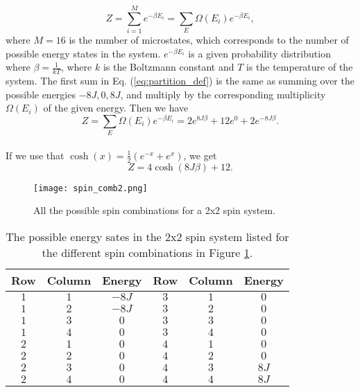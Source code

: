 \documentclass[12pt]{article}
\begin{document}
\begin{flushleft}
\vspace{5mm}
\begin{equation}\label{eq:partition_def}
Z = \sum\limits_{i=1}^{M}e^{-\beta E_i} = \sum\limits_E \Omega(E_i)e^{-\beta E_i},
\end{equation}
\vspace{5mm} 
where $M = 16$ is the number of microstates, which corresponds to the number of possible energy states in the system. $e^{-\beta E_i}$ is a given probability distribution where $\beta = \frac{1}{kT}$, where $k$ is the Boltzmann constant and $T$ is the temperature of the system. The first sum in Eq. (\ref{eq:partition_def}) is the same as summing over the possible energies $-8J, 0, 8J$, and multiply by the corresponding multiplicity $\Omega(E_i)$ of the given energy. Then we have\\
\vspace{5mm}
$$Z = \sum\limits_E \Omega(E_i)e^{-\beta E_i} = 2e^{8J\beta} + 12e^{0}+2e^{-8J\beta}.$$\\
\vspace{5mm}  
If we use that $\cosh(x) = \frac{1}{2}\left(e^{-x} + e^{x}\right)$, we get
\vspace{5mm}
\begin{equation}\label{eq:expr_Z}
Z = 4\cosh(8J\beta) + 12.
\end{equation}

\begin{figure}[!h]
\begin{center}
\texttt{[image: spin\_comb2.png]}
\caption{\label{fig:spin_comb}All the possible spin combinations for a 2x2 spin system.}
\end{center}
\end{figure}

\begin{table}[!h]
\begin{center}
\begin{tabular}{| c | c | c || c | c | c |}
	\hline
	\textbf{Row} & \textbf{Column} & \textbf{Energy} & \textbf{Row} & \textbf{Column} & \textbf{Energy}\\
	\hline	
	$1$ & $1$ & $-8J$ & $3$ & $1$ & $0$ \\
	$1$ & $2$ & $-8J$ & $3$ & $2$ & $0$ \\	
	$1$ & $3$ & $0$ & $3$ & $3$ & $0$ \\
	$1$ & $4$ & $0$ & $3$ & $4$ & $0$ \\
	$2$ & $1$ & $0$ & $4$ & $1$ & $0$ \\
	$2$ & $2$ & $0$ & $4$ & $2$ & $0$\\
	$2$ & $3$ & $0$ & $4$ & $3$ & $8J$\\
	$2$ & $4$ & $0$ & $4$ & $4$ & $8J$\\
  \hline
\end{tabular}
\end{center}
\caption{\label{tab:energy_states}The possible energy sates in the 2x2 spin system listed for the different spin combinations in Figure \ref{fig:spin_comb}.}
\end{table}

\end{flushleft}
\end{document}
